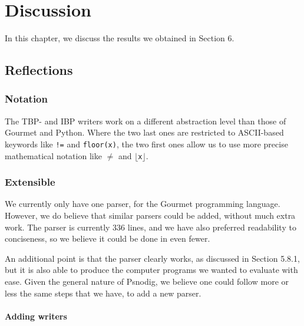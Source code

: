 \chapter{Discussion}

In this chapter, we discuss the results we obtained in Section 6.

\section{Reflections}

\subsection{Notation}

The TBP- and IBP writers work on a different abstraction level than those of Gourmet and Python. Where the two last ones are restricted to ASCII-based keywords like \texttt{!=} and \texttt{floor(x)}, the two first ones allow us to use more precise mathematical notation like \texttt{$\neq$} and \texttt{$\lfloor$x$\rfloor$}.

\subsection{Extensible}

We currently only have one parser, for the Gourmet programming language. However, we do believe that similar parsers could be added, without much extra work. The parser is currently 336 lines, and we have also preferred readability to conciseness, so we believe it could be done in even fewer. \\


An additional point is that the parser clearly works, as discussed in Section 5.8.1, but it is also able to produce the computer programs we wanted to evaluate with ease. Given the general nature of Psnodig, we believe one could follow more or less the same steps that we have, to add a new parser.

\subsubsection{Adding writers}


